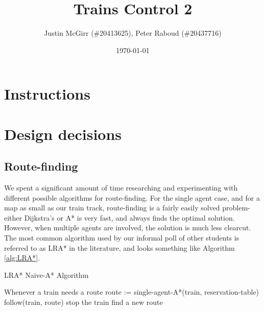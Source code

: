 \documentclass{article}
\title{Trains Control 2}
\author{Justin McGirr (\#20413625), Peter Raboud (\#20437716)}
\date{\today}
\begin{document}
\maketitle

\section{Instructions}


\section{Design decisions}

\subsection{Route-finding}
We spent a significant amount of time researching and experimenting with
different possible algorithms for route-finding. For the single agent case,
and for a map as small as our train track, route-finding is a fairly easily
solved problem- either Dijkstra's or A* is very fast, and always finds the
optimal solution. However, when multiple agents are involved, the solution
is much less clearcut. The most common algorithm used by our informal poll
of other students is referred to as LRA* in the literature, and looks
something like Algorithm \ref{alg:LRA*}.
\begin{algorithm}
\label{alg:LRA*}
\caption{LRA* Naive-A* Algorithm}
\begin{algorithmic}
\Loop
\State Whenever a train needs a route
\State route := single-agent-A*(train, reservation-table)
\State follow(train, route)
\EndLoop
{}
		\State stop the train
		\State find a new route
	\EndIf
	\State [...]
\EndFunction
\end{algorithmic}
\end{algorithm}
\end{document}
